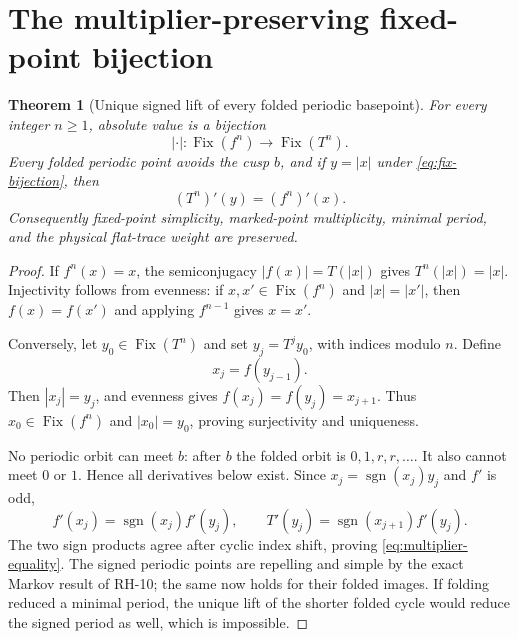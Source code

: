 \documentclass[11pt]{article}
\newtheorem{theorem}{Theorem}[section]
\theoremstyle{remark}
\newcommand{\Fix}{\operatorname{Fix}}
\begin{document}
\section{The multiplier-preserving fixed-point bijection}

\begin{theorem}[Unique signed lift of every folded periodic basepoint]
\label{thm:fixed-bijection}
For every integer $n\ge1$, absolute value is a bijection
\begin{equation}\label{eq:fix-bijection}
 |\cdot|:\Fix(f^n)\longrightarrow\Fix(T^n).
\end{equation}
Every folded periodic point avoids the cusp $b$, and if $y=|x|$ under
\eqref{eq:fix-bijection}, then
\begin{equation}\label{eq:multiplier-equality}
 (T^n)'(y)=(f^n)'(x).
\end{equation}
Consequently fixed-point simplicity, marked-point multiplicity, minimal
period, and the physical flat-trace weight are preserved.
\end{theorem}

\begin{proof}
If $f^n(x)=x$, the semiconjugacy $|f(x)|=T(|x|)$ gives
$T^n(|x|)=|x|$.  Injectivity follows from evenness: if $x,x'\in\Fix(f^n)$
and $|x|=|x'|$, then $f(x)=f(x')$ and applying $f^{n-1}$ gives $x=x'$.

Conversely, let $y_0\in\Fix(T^n)$ and set $y_j=T^jy_0$, with indices
modulo $n$.  Define
\begin{equation}\label{eq:unique-lift}
 x_j=f(y_{j-1}).
\end{equation}
Then $|x_j|=y_j$, and evenness gives
$f(x_j)=f(y_j)=x_{j+1}$.  Thus $x_0\in\Fix(f^n)$ and
$|x_0|=y_0$, proving surjectivity and uniqueness.

No periodic orbit can meet $b$: after $b$ the folded orbit is
$0,1,r,r,\ldots$.  It also cannot meet $0$ or $1$.  Hence all derivatives
below exist.  Since $x_j=\operatorname{sgn}(x_j)y_j$ and $f'$ is odd,
\[
 f'(x_j)=\operatorname{sgn}(x_j)f'(y_j),
 \qquad
 T'(y_j)=\operatorname{sgn}(x_{j+1})f'(y_j).
\]
The two sign products agree after cyclic index shift, proving
\eqref{eq:multiplier-equality}.  The signed periodic points are repelling and
simple by the exact Markov result of RH-10; the same now holds for their
folded images.  If folding reduced a minimal period, the unique lift of the
shorter folded cycle would reduce the signed period as well, which is
impossible.
\end{proof}
\end{document}

